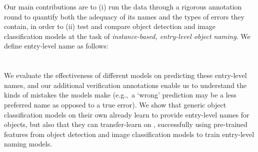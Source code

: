 Our main contributions are to (i) run the \mn data through a rigorous annotation round to quantify both the adequacy of its names and the types of errors they contain, in order to (ii) test and compare object detection and image classification models at the task of \emph{instance-based, entry-level object naming}. 
We define entry-level name as follows:\\
\\\\
We evaluate the effectiveness of different models on predicting these entry-level names, and our additional verification annotations enable us to understand the kinds of mistakes the models make (e.g.,~a `wrong' prediction may be a less preferred name as opposed to a true error).
We show that generic object classification models on their own already learn to provide entry-level names for objects, but also that they can transfer-learn on \mn, successfully using pre-trained features from object detection and image classification models to train entry-level naming models. 


%


\iffalse



